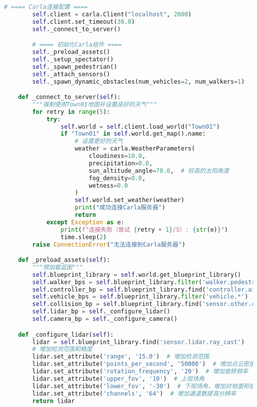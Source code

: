 \begin{lstlisting}[language=Python]
        # ==== Carla连接配置 ====
        self.client = carla.Client("localhost", 2000)
        self.client.set_timeout(30.0)
        self._connect_to_server()

        # ==== 初始化Carla组件 ====
        self._preload_assets()
        self._setup_spectator()
        self._spawn_pedestrian()
        self._attach_sensors()
        self._spawn_dynamic_obstacles(num_vehicles=2, num_walkers=1)

    def _connect_to_server(self):
        """强制使用Town01地图并设置良好的天气"""
        for retry in range(5):
            try:
                self.world = self.client.load_world("Town01")
                if "Town01" in self.world.get_map().name:
                    # 设置更好的天气
                    weather = carla.WeatherParameters(
                        cloudiness=10.0,
                        precipitation=0.0,
                        sun_altitude_angle=70.0,  # 较高的太阳角度
                        fog_density=0.0,
                        wetness=0.0
                    )
                    self.world.set_weather(weather)
                    print("成功连接Carla服务器")
                    return
            except Exception as e:
                print(f"连接失败（尝试 {retry + 1}/5）: {str(e)}")
                time.sleep(2)
        raise ConnectionError("无法连接到Carla服务器")

    def _preload_assets(self):
        """预加载蓝图"""
        self.blueprint_library = self.world.get_blueprint_library()
        self.walker_bps = self.blueprint_library.filter('walker.pedestrian.*')
        self.controller_bp = self.blueprint_library.find('controller.ai.walker')
        self.vehicle_bps = self.blueprint_library.filter('vehicle.*')
        self.collision_bp = self.blueprint_library.find('sensor.other.collision')
        self.lidar_bp = self._configure_lidar()
        self.camera_bp = self._configure_camera()

    def _configure_lidar(self):
        lidar = self.blueprint_library.find('sensor.lidar.ray_cast')
        # 增加检测范围和精度
        lidar.set_attribute('range', '15.0')  # 增加检测范围
        lidar.set_attribute('points_per_second', '50000')  # 增加点云密度
        lidar.set_attribute('rotation_frequency', '20')  # 增加旋转频率
        lidar.set_attribute('upper_fov', '10')  # 上视场角
        lidar.set_attribute('lower_fov', '-30')  # 下视场角，增加对地面和低障碍物的检测
        lidar.set_attribute('channels', '64')  # 增加通道数提高分辨率
        return lidar


\end{lstlisting}
